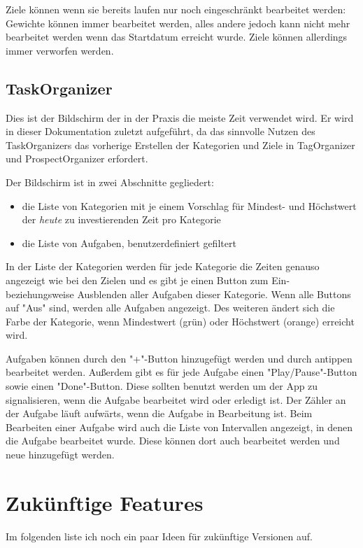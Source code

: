 \documentclass[10pt,a4paper]{article}
\begin{document}
Ziele können wenn sie bereits laufen nur noch eingeschränkt bearbeitet werden: Gewichte können immer bearbeitet werden, alles andere jedoch kann nicht mehr bearbeitet werden wenn das Startdatum erreicht wurde. Ziele können allerdings immer verworfen werden.

\subsection{TaskOrganizer}
Dies ist der Bildschirm der in der Praxis die meiste Zeit verwendet wird. Er wird in dieser Dokumentation zuletzt aufgeführt, da das sinnvolle Nutzen des TaskOrganizers das vorherige Erstellen der Kategorien und Ziele in TagOrganizer und ProspectOrganizer erfordert.

Der Bildschirm ist in zwei Abschnitte gegliedert:
\begin{itemize}
	\item die Liste von Kategorien mit je einem Vorschlag für Mindest- und Höchstwert der \textit{heute} zu investierenden Zeit pro Kategorie
	\item die Liste von Aufgaben, benutzerdefiniert gefiltert
\end{itemize}
In der Liste der Kategorien werden für jede Kategorie die Zeiten genauso angezeigt wie bei den Zielen und es gibt je einen Button zum Ein- beziehungsweise Ausblenden aller Aufgaben dieser Kategorie. Wenn alle Buttons auf "Aus" sind, werden alle Aufgaben angezeigt. Des weiteren ändert sich die Farbe der Kategorie, wenn Mindestwert (grün) oder Höchstwert (orange) erreicht wird. 

Aufgaben können durch den "+"-Button hinzugefügt werden und durch antippen bearbeitet werden. Außerdem gibt es für jede Aufgabe einen "Play/Pause"-Button sowie einen "Done"-Button. Diese sollten benutzt werden um der App zu signalisieren, wenn die Aufgabe bearbeitet wird oder erledigt ist. Der Zähler an der Aufgabe läuft aufwärts, wenn die Aufgabe in Bearbeitung ist. Beim Bearbeiten einer Aufgabe wird auch die Liste von Intervallen angezeigt, in denen die Aufgabe bearbeitet wurde. Diese können dort auch bearbeitet werden und neue hinzugefügt werden.

\section{Zukünftige Features}
Im folgenden liste ich noch ein paar Ideen für zukünftige Versionen auf.
\end{document}
